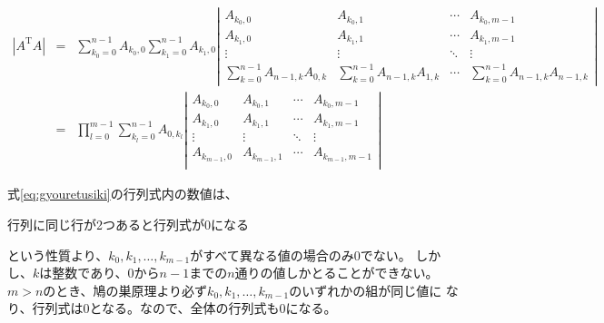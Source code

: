 \documentclass{jsarticle}
\begin{document}
\begin{eqnarray}
    |A^\mathrm{T}A|&=&
    \sum^{n-1}_{k_0=0}A_{k_0,0}
    \sum^{n-1}_{k_1=0}A_{k_1,0}
    \left|
    \begin{array}{cccc}
        A_{k_0,0} & A_{k_0,1} & \cdots & A_{k_0,m-1} \\
        A_{k_1,0} & A_{k_1,1} & \cdots & A_{k_1,m-1} \\
        \vdots & \vdots & \ddots & \vdots \\
        \sum^{n-1}_{k=0}A_{n-1,k}A_{0,k} &\sum^{n-1}_{k=0}A_{n-1,k}A_{1,k} & \cdots & \sum^{n-1}_{k=0}A_{n-1,k}A_{n-1,k}
    \end{array}
    \right|\\
    &=&
    \prod^{m-1}_{l=0}
    \sum^{n-1}_{k_l=0}A_{0,k_l}
    \left|
    \begin{array}{cccc}
        A_{k_0,0} & A_{k_0,1} & \cdots & A_{k_0,m-1} \\
        A_{k_1,0} & A_{k_1,1} & \cdots & A_{k_1,m-1} \\
        \vdots & \vdots & \ddots & \vdots \\
        A_{k_{m-1},0} & A_{k_{m-1},1} & \cdots & A_{k_{m-1},m-1} \\
    \end{array}
    \right|\label{eq:gyouretusiki}
\end{eqnarray}

式\ref{eq:gyouretusiki}の行列式内の数値は、

行列に同じ行が2つあると行列式が0になる

という性質より、\(k_0,k_1,\ldots,k_{m-1}\)がすべて異なる値の場合のみ0でない。
しかし、\(k\)は整数であり、\(0\)から\(n-1\)までの\(n\)通りの値しかとることができない。
\(m>n\)のとき、鳩の巣原理より必ず\(k_0,k_1,\ldots,k_{m-1}\)のいずれかの組が同じ値に
なり、行列式は0となる。なので、全体の行列式も0になる。
\end{document}

